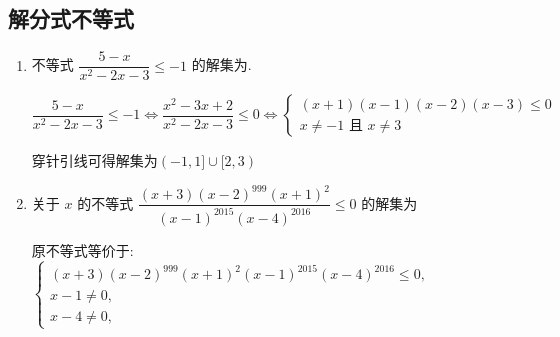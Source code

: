 \subsection*{解分式不等式}
\begin{enumerate}
    \item 不等式 $\dfrac{5 - x}{{x}^{2} - {2x} - 3} \leq   - 1$ 的解集为.
    \begin{jieda}
        $\dfrac{5 - x}{{x}^{2} - {2x} - 3} \leq   - 1 \Longleftrightarrow \dfrac{{x}^{2} - {3x} + 2}{{x}^{2} - {2x} - 3} \leq  0 \Longleftrightarrow\left\{  \begin{array}{l} \left( {x + 1}\right) \left( {x - 1}\right) \left( {x - 2}\right) \left( {x - 3}\right)  \leq  0 \\  x \neq   - 1\text{ 且 }x \neq  3 \end{array}\right.$

        穿针引线可得解集为$\left( {-1,1\rbrack \cup \lbrack 2,3}\right)$ 
    \end{jieda} 

    \item 关于 $x$ 的不等式 $\dfrac{\left( {x + 3}\right) {\left( x - 2\right) }^{999}{\left( x + 1\right) }^{2}}{{\left( x - 1\right) }^{2015}{\left( x - 4\right) }^{2016}} \leq  0$ 的解集为
    \begin{jieda}
        原不等式等价于: $\left\{  \begin{array}{l} \left( {x + 3}\right) {\left( x - 2\right) }^{999}{\left( x + 1\right) }^{2}{\left( x - 1\right) }^{2015}{\left( x - 4\right) }^{2016} \leq  0, \\  x - 1 \neq  0, \\  x - 4 \neq  0, \end{array}\right. $
        

\end{jieda}
\end{enumerate}
